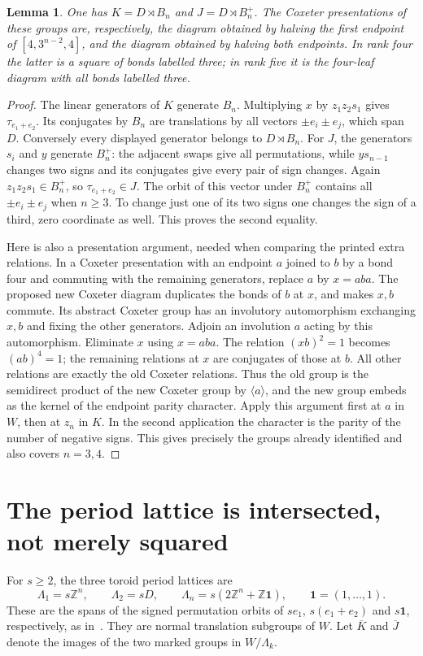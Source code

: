 \documentclass[11pt,a4paper]{article}
\newtheorem{lemma}[theorem]{Lemma}
\newcommand{\Z}{\mathbb Z}
\newcommand{\gen}[1]{\langle #1\rangle}
\newcommand{\one}{\mathbf1}
\begin{document}
\begin{lemma}\label{universal}
One has $K=D\rtimes B_n$ and $J=D\rtimes B_n^+$.
The Coxeter presentations of these groups are, respectively, the
diagram obtained by halving the first endpoint of
$[4,3^{n-2},4]$, and the diagram obtained by halving both endpoints.
In rank four the latter is a square of bonds labelled three;
in rank five it is the four-leaf diagram with all bonds labelled three.
\end{lemma}
\begin{proof}
The linear generators of $K$ generate $B_n$. Multiplying $x$ by
$z_1z_2s_1$ gives $\tau_{e_1+e_2}$. Its conjugates by $B_n$
are translations by all vectors $\pm e_i\pm e_j$, which span $D$.
Conversely every displayed generator belongs to $D\rtimes B_n$.
For $J$, the generators $s_i$ and $y$ generate $B_n^+$: the
adjacent swaps give all permutations, while $ys_{n-1}$ changes
two signs and its conjugates give every pair of sign changes.
Again $z_1z_2s_1\in B_n^+$, so $\tau_{e_1+e_2}\in J$.
The orbit of this vector under $B_n^+$ contains all
$\pm e_i\pm e_j$ when $n\ge3$. To change just one of its two
signs one changes the sign of a third, zero coordinate as well.
This proves the second equality.

Here is also a presentation argument, needed when comparing the
printed extra relations. In a Coxeter presentation with an endpoint
$a$ joined to $b$ by a bond four and commuting with the remaining
generators, replace $a$ by $x=aba$. The proposed new Coxeter
diagram duplicates the bonds of $b$ at $x$, and makes $x,b$ commute.
Its abstract Coxeter group has an involutory automorphism exchanging
$x,b$ and fixing the other generators. Adjoin an involution $a$
acting by this automorphism. Eliminate $x$ using $x=aba$.
The relation $(xb)^2=1$ becomes $(ab)^4=1$; the remaining
relations at $x$ are conjugates of those at $b$. All other
relations are exactly the old Coxeter relations. Thus the old
group is the semidirect product of the new Coxeter group by
$\gen a$, and the new group embeds as the kernel of the endpoint
parity character. Apply this argument first at $a$ in $W$, then
at $z_n$ in $K$. In the second application the character is the
parity of the number of negative signs. This gives precisely
the groups already identified and also covers $n=3,4$.
\end{proof}

\section{The period lattice is intersected, not merely squared}
For $s\ge2$, the three toroid period lattices are
\[
 \Lambda_1=s\Z^n,\qquad \Lambda_2=sD,\qquad
 \Lambda_n=s(2\Z^n+\Z\one),\qquad \one=(1,\ldots,1).
\]
These are the spans of the signed permutation orbits of
$se_1$, $s(e_1+e_2)$ and $s\one$, respectively, as in~\cite{PT}.
They are normal translation subgroups of $W$.
Let $\overline K$ and $\overline J$ denote the images of the two
marked groups in $W/\Lambda_k$.
\end{document}

